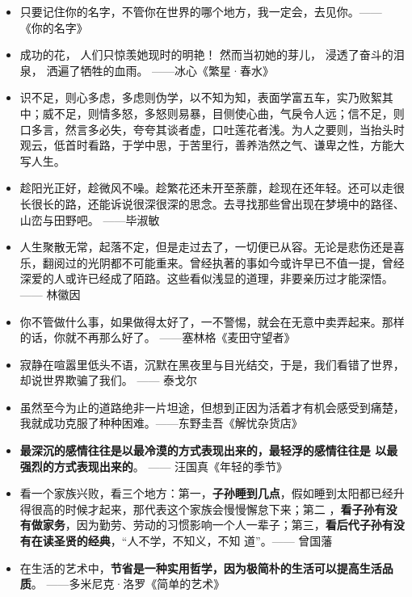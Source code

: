 \documentclass[UTF8,a4paper,8pt]{ctexbook}
\begin{document}
\begin{itemize}
		\item 只要记住你的名字，不管你在世界的哪个地方，我一定会，去见你。—— 《你的名字》
		
		\item 成功的花， 人们只惊羡她现时的明艳！ 然而当初她的芽儿， 浸透了奋斗的泪泉， 洒遍了牺牲的血雨。 ——冰心《繁星·春水》
		
		\item 识不足，则心多虑，多虑则伪学，以不知为知，表面学富五车，实乃败絮其中；威不足，则情多怒，多怒则易暴，目侧使心曲，气戾令人远；信不足，则口多言，然言多必失，夸夸其谈者虚，口吐莲花者浅。为人之要则，当抬头时观云，低首时看路，于学中思，于苦里行，善养浩然之气、谦卑之性，方能大写人生。
		
		\item 趁阳光正好，趁微风不噪。趁繁花还未开至荼蘼，趁现在还年轻。还可以走很长很长的路，还能诉说很深很深的思念。去寻找那些曾出现在梦境中的路径、山峦与田野吧。 ——毕淑敏
		
		\item 人生聚散无常，起落不定，但是走过去了，一切便已从容。无论是悲伤还是喜乐，翻阅过的光阴都不可能重来。曾经执著的事如今或许早已不值一提，曾经深爱的人或许已经成了陌路。这些看似浅显的道理，非要亲历过才能深悟。—— 林徽因
		
		\item 你不管做什么事，如果做得太好了，一不警惕，就会在无意中卖弄起来。那样的话，你就不再那么好了。	——塞林格《麦田守望者》
		
		\item 寂静在喧嚣里低头不语，沉默在黑夜里与目光结交，于是，我们看错了世界，却说世界欺骗了我们。 —— 泰戈尔
		
		\item 虽然至今为止的道路绝非一片坦途，但想到正因为活着才有机会感受到痛楚，我就成功克服了种种困难。——东野圭吾《解忧杂货店》
		
		\item \textbf{最深沉的感情往往是以最冷漠的方式表现出来的，最轻浮的感情往往是 以最强烈的方式表现出来的}。 —— 汪国真《年轻的季节》
		
		\item 看一个家族兴败，看三个地方：第一，\textbf{子孙睡到几点}，假如睡到太阳都已经升得很高的时候才起来，那代表这个家族会慢慢懈怠下来；第二 ，\textbf{看子孙有没有做家务}，因为勤劳、劳动的习惯影响一个人一辈子；第三，\textbf{看后代子孙有没有在读圣贤的经典}，“人不学，不知义，不知 道”。—— 曾国藩
		
		\item 在生活的艺术中，\textbf{节省是一种实用哲学，因为极简朴的生活可以提高生活品质}。	——多米尼克·洛罗《简单的艺术》
		

\end{itemize}
\end{document}
